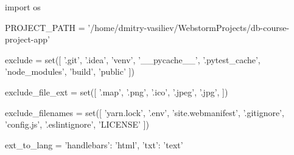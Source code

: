 \begin{pycode}
import os

PROJECT_PATH = '/home/dmitry-vasiliev/WebstormProjects/db-course-project-app'

exclude = set([
    '.git',
    '.idea',
    'venv',
    '__pycache__',
    '.pytest_cache',
    'node_modules',
    'build',
    'public'
])

exclude_file_ext = set([
    '.map',
    '.png',
    '.ico',
    '.jpeg',
    '.jpg',
])

exclude_filenames = set([
    'yarn.lock',
    '.env',
    'site.webmanifest',
    '.gitignore',
    'config.js',
    '.eslintignore',
    'LICENSE'
])

ext_to_lang = {
    'handlebars': 'html',
    'txt': 'text'
}
\end{pycode}